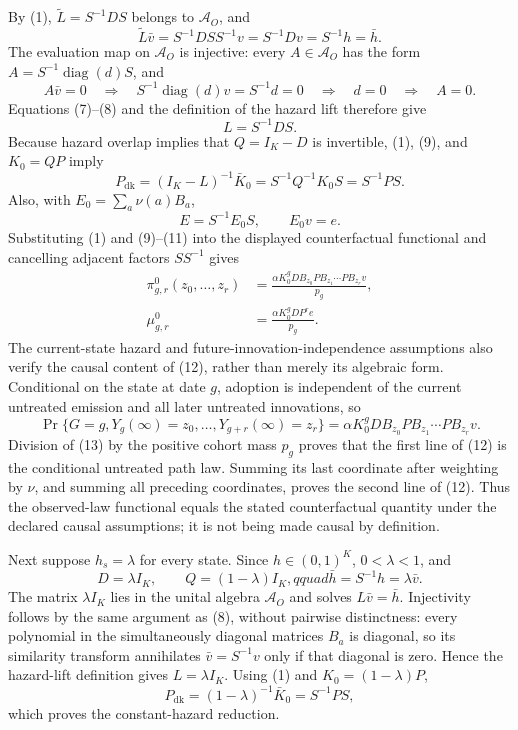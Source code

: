 By (1), \(\widetilde L=S^{-1}DS\) belongs to \(\mathcal A_O\), and
\[
 \widetilde L\bar v=S^{-1}DS S^{-1}v=S^{-1}Dv=S^{-1}h=\bar h.                  \tag{7}
\]
The evaluation map on \(\mathcal A_O\) is injective: every \(A\in\mathcal A_O\) has the form \(A=S^{-1}\operatorname{diag}(d)S\), and
\[
 A\bar v=0
 \quad\Longrightarrow\quad
 S^{-1}\operatorname{diag}(d)v=S^{-1}d=0
 \quad\Longrightarrow\quad d=0
 \quad\Longrightarrow\quad A=0.                                               \tag{8}
\]
Equations (7)--(8) and the definition of the hazard lift therefore give
\[
 L=S^{-1}DS.                                                                     \tag{9}
\]
Because hazard overlap implies that \(Q=I_K-D\) is invertible, (1), (9), and \(K_0=QP\) imply
\[
 P_{\mathrm{dk}}
 =(I_K-L)^{-1}\bar K_0
 =S^{-1}Q^{-1}K_0S
 =S^{-1}PS.                                                                       \tag{10}
\]
Also, with \(E_0=\sum_a\nu(a)B_a\),
\[
 E=S^{-1}E_0S,
 \qquad E_0v=e.                                                                  \tag{11}
\]
Substituting (1) and (9)--(11) into the displayed counterfactual functional and cancelling adjacent factors \(SS^{-1}\) gives
\[
 \begin{aligned}
 \pi^0_{g,r}(z_0,\ldots,z_r)
 &=\frac{\alpha K_0^gDB_{z_0}PB_{z_1}\cdots PB_{z_r}v}{p_g},\\
 \mu^0_{g,r}
 &=\frac{\alpha K_0^gDP^re}{p_g}.
 \end{aligned}                                                                  \tag{12}
\]
The current-state hazard and future-innovation-independence assumptions also verify the causal content of (12), rather than merely its algebraic form.  Conditional on the state at date \(g\), adoption is independent of the current untreated emission and all later untreated innovations, so
\[
 \Pr\{G=g,Y_g(\infty)=z_0,\ldots,Y_{g+r}(\infty)=z_r\}
 =\alpha K_0^gDB_{z_0}PB_{z_1}\cdots PB_{z_r}v.                                 \tag{13}
\]
Division of (13) by the positive cohort mass \(p_g\) proves that the first line of (12) is the conditional untreated path law.  Summing its last coordinate after weighting by \(\nu\), and summing all preceding coordinates, proves the second line of (12).  Thus the observed-law functional equals the stated counterfactual quantity under the declared causal assumptions; it is not being made causal by definition.

Next suppose \(h_s=\lambda\) for every state.  Since \(h\in(0,1)^K\), \(0<\lambda<1\), and
\[
 D=\lambda I_K,\qquad Q=(1-\lambda)I_K,qquad \bar h=S^{-1}h=\lambda\bar v.
\]
The matrix \(\lambda I_K\) lies in the unital algebra \(\mathcal A_O\) and solves \(L\bar v=\bar h\).  Injectivity follows by the same argument as (8), without pairwise distinctness: every polynomial in the simultaneously diagonal matrices \(B_a\) is diagonal, so its similarity transform annihilates \(\bar v=S^{-1}v\) only if that diagonal is zero.  Hence the hazard-lift definition gives \(L=\lambda I_K\).  Using (1) and \(K_0=(1-\lambda)P\),
\[
 P_{\mathrm{dk}}
 =(1-\lambda)^{-1}\bar K_0
 =S^{-1}PS,                                                                       \tag{14}
\]
which proves the constant-hazard reduction.

